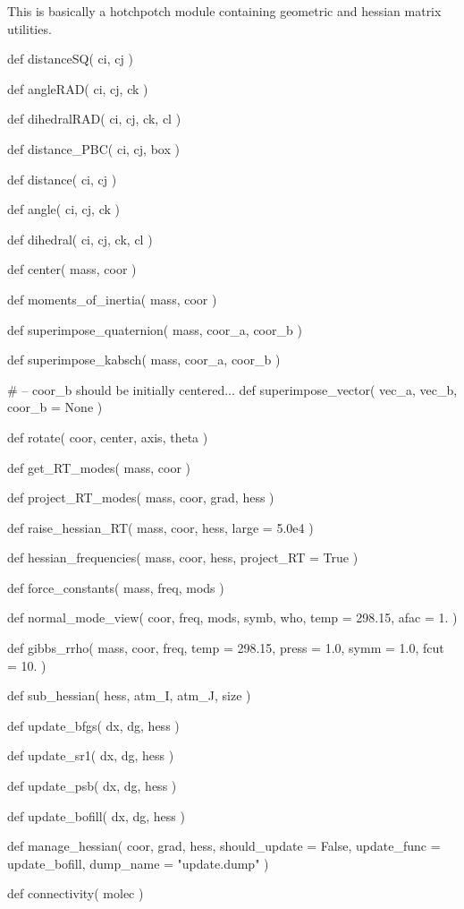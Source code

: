 \normalsize
This is basically a hotchpotch module containing geometric and hessian matrix utilities. 
\begin{pyglist}[language=python,fvset={frame=single}]
def distanceSQ( ci, cj )

def angleRAD( ci, cj, ck )

def dihedralRAD( ci, cj, ck, cl )

def distance_PBC( ci, cj, box )

def distance( ci, cj )

def angle( ci, cj, ck )

def dihedral( ci, cj, ck, cl )

def center( mass, coor )

def moments_of_inertia( mass, coor )

def superimpose_quaternion( mass, coor_a, coor_b )

def superimpose_kabsch( mass, coor_a, coor_b )

# -- coor_b should be initially centered...
def superimpose_vector( vec_a, vec_b, coor_b = None )

def rotate( coor, center, axis, theta )

def get_RT_modes( mass, coor )

def project_RT_modes( mass, coor, grad, hess )

def raise_hessian_RT( mass, coor, hess, large = 5.0e4 )

def hessian_frequencies( mass, coor, hess, project_RT = True )

def force_constants( mass, freq, mods )

def normal_mode_view( coor, freq, mods, symb, who, temp = 298.15, afac = 1. )

def gibbs_rrho( mass, coor, freq, temp = 298.15, press = 1.0, symm = 1.0, fcut = 10. )

def sub_hessian( hess, atm_I, atm_J, size )

def update_bfgs( dx, dg, hess )

def update_sr1( dx, dg, hess )

def update_psb( dx, dg, hess )

def update_bofill( dx, dg, hess )

def manage_hessian( coor, grad, hess, should_update = False, update_func = update_bofill,
    dump_name = "update.dump" )

def connectivity( molec )
\end{pyglist}
